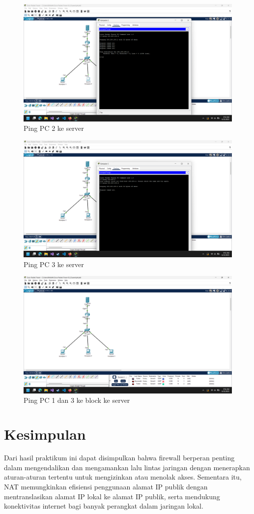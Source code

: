     \begin{figure}[H]
        \centering
        \includegraphics[width=0.5\linewidth]{pingpc2keserver.png}
        \caption{Ping PC 2 ke server}
        \label{fig:gambar}
    \end{figure}

    \begin{figure}[H]
        \centering
        \includegraphics[width=0.5\linewidth]{pingpc3keserver.png}
        \caption{Ping PC 3 ke server}
        \label{fig:gambar}
    \end{figure}

    \begin{figure}[H]
        \centering
        \includegraphics[width=0.5\linewidth]{pingpckeserver.png}
        \caption{Ping PC 1 dan 3 ke block ke server}
        \label{fig:gambar}
    \end{figure}
\section{Kesimpulan}
Dari hasil praktikum ini dapat disimpulkan bahwa firewall berperan penting dalam mengendalikan dan 
mengamankan lalu lintas jaringan dengan menerapkan aturan-aturan tertentu untuk mengizinkan atau 
menolak akses. Sementara itu, NAT memungkinkan efisiensi penggunaan alamat IP publik dengan 
mentranslasikan alamat IP lokal ke alamat IP publik, serta mendukung konektivitas internet bagi 
banyak perangkat dalam jaringan lokal.


